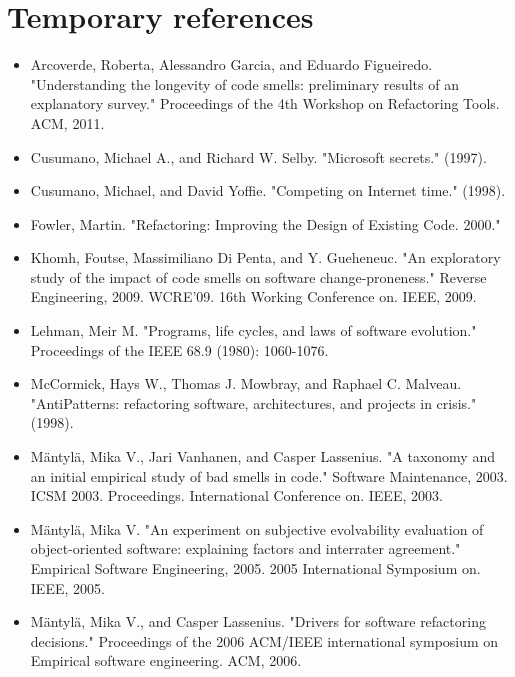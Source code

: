 \documentclass[english,12pt,a4paper,pdftex,sci,utf8]{aaltothesis}
\begin{document}
\section{Temporary references}
\begin{itemize}
\item Arcoverde, Roberta, Alessandro Garcia, and Eduardo Figueiredo. "Understanding the longevity of code smells: preliminary results of an explanatory survey." Proceedings of the 4th Workshop on Refactoring Tools. ACM, 2011.

\item Cusumano, Michael A., and Richard W. Selby. "Microsoft secrets." (1997).

\item Cusumano, Michael, and David Yoffie. "Competing on Internet time." (1998).

\item Fowler, Martin. "Refactoring: Improving the Design of Existing Code. 2000."

\item Khomh, Foutse, Massimiliano Di Penta, and Y. Gueheneuc. "An exploratory study of the impact of code smells on software change-proneness." Reverse Engineering, 2009. WCRE'09. 16th Working Conference on. IEEE, 2009.

\item Lehman, Meir M. "Programs, life cycles, and laws of software evolution." Proceedings of the IEEE 68.9 (1980): 1060-1076.

\item McCormick, Hays W., Thomas J. Mowbray, and Raphael C. Malveau. "AntiPatterns: refactoring software, architectures, and projects in crisis." (1998).

\item Mäntylä, Mika V., Jari Vanhanen, and Casper Lassenius. "A taxonomy and an initial empirical study of bad smells in code." Software Maintenance, 2003. ICSM 2003. Proceedings. International Conference on. IEEE, 2003.

\item Mäntylä, Mika V. "An experiment on subjective evolvability evaluation of object-oriented software: explaining factors and interrater agreement." Empirical Software Engineering, 2005. 2005 International Symposium on. IEEE, 2005.

\item Mäntylä, Mika V., and Casper Lassenius. "Drivers for software refactoring decisions." Proceedings of the 2006 ACM/IEEE international symposium on Empirical software engineering. ACM, 2006.


\end{itemize}
\end{document}
